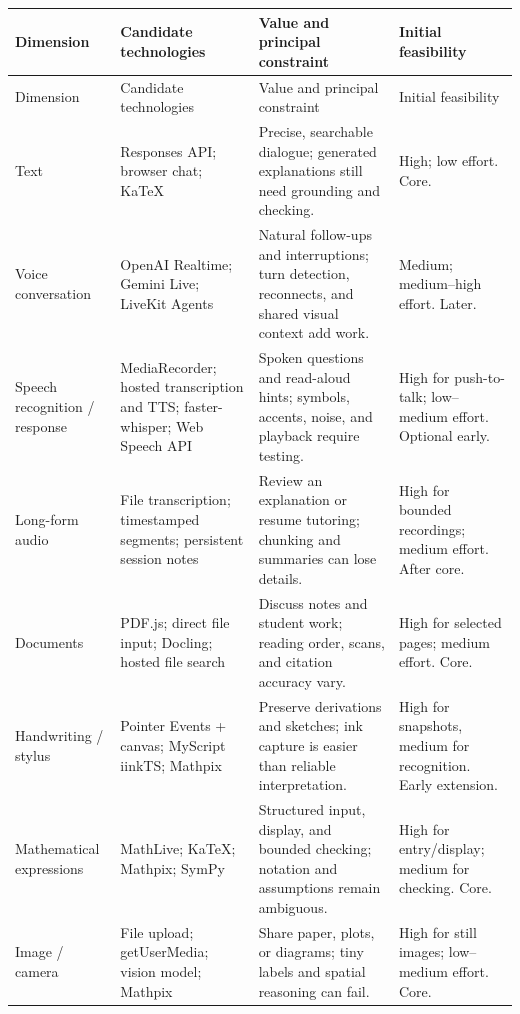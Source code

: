 \documentclass[11pt]{article}
\begin{document}
\small
\begin{longtable}{@{}P{0.15\textwidth}P{0.28\textwidth}P{0.32\textwidth}P{0.17\textwidth}@{}}
\toprule
Dimension & Candidate technologies & Value and principal constraint & Initial feasibility \\
\midrule
\endfirsthead
\toprule Dimension & Candidate technologies & Value and principal constraint & Initial feasibility \\
\midrule
\endhead
Text & Responses API; browser chat; KaTeX \cite{text,katex} & Precise, searchable dialogue; generated explanations still need grounding and checking. & High; low effort. Core. \\
\addlinespace
Voice conversation & OpenAI Realtime; Gemini Live; LiveKit Agents \cite{realtime,live,livekit} & Natural follow-ups and interruptions; turn detection, reconnects, and shared visual context add work. & Medium; medium--high effort. Later. \\
\addlinespace
Speech recognition / response & MediaRecorder; hosted transcription and TTS; faster-whisper; Web Speech API \cite{recorder,stt,tts,whisper,webspeech} & Spoken questions and read-aloud hints; symbols, accents, noise, and playback require testing. & High for push-to-talk; low--medium effort. Optional early. \\
\addlinespace
Long-form audio & File transcription; timestamped segments; persistent session notes \cite{stt,whisper} & Review an explanation or resume tutoring; chunking and summaries can lose details. & High for bounded recordings; medium effort. After core. \\
\addlinespace
Documents & PDF.js; direct file input; Docling; hosted file search \cite{pdfjs,files,docling,retrieval} & Discuss notes and student work; reading order, scans, and citation accuracy vary. & High for selected pages; medium effort. Core. \\
\addlinespace
Handwriting / stylus & Pointer Events + canvas; MyScript iinkTS; Mathpix \cite{pointer,myscript,mathpix} & Preserve derivations and sketches; ink capture is easier than reliable interpretation. & High for snapshots, medium for recognition. Early extension. \\
\addlinespace
Mathematical expressions & MathLive; KaTeX; Mathpix; SymPy \cite{mathlive,katex,mathpix,sympy} & Structured input, display, and bounded checking; notation and assumptions remain ambiguous. & High for entry/display; medium for checking. Core. \\
\addlinespace
Image / camera & File upload; getUserMedia; vision model; Mathpix \cite{media,vision,mathpix} & Share paper, plots, or diagrams; tiny labels and spatial reasoning can fail. & High for still images; low--medium effort. Core. \\

\end{longtable}
\end{document}

